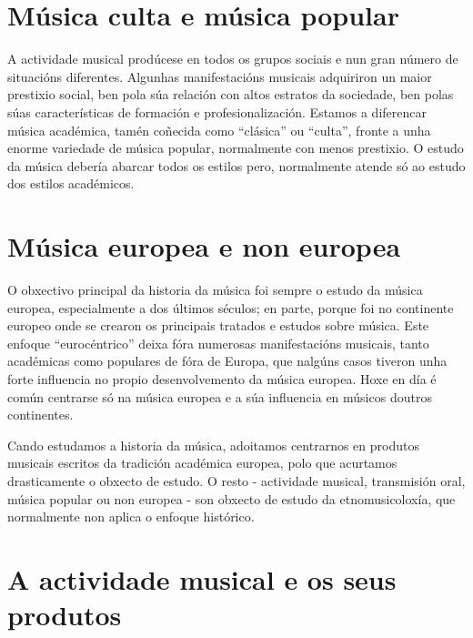 \documentclass[a4paper, twoside]{templates/ociamthesis}
\begin{document}
\hypertarget{muxfasica-culta-e-muxfasica-popular}{%
\section{Música culta e música popular}\label{muxfasica-culta-e-muxfasica-popular}}

A actividade musical prodúcese en todos os grupos sociais e nun gran número de situacións diferentes. Algunhas manifestacións musicais adquiriron un maior prestixio social, ben pola súa relación con altos estratos da sociedade, ben polas súas características de formación e profesionalización. Estamos a diferencar música académica, tamén coñecida como ``clásica'' ou ``culta'', fronte a unha enorme variedade de música popular, normalmente con menos prestixio. O estudo da música debería abarcar todos os estilos pero, normalmente atende só ao estudo dos estilos académicos.

\hypertarget{muxfasica-europea-e-non-europea}{%
\section{Música europea e non europea}\label{muxfasica-europea-e-non-europea}}

O obxectivo principal da historia da música foi sempre o estudo da música europea, especialmente a dos últimos séculos; en parte, porque foi no continente europeo onde se crearon os principais tratados e estudos sobre música. Este enfoque ``eurocéntrico'' deixa fóra numerosas manifestacións musicais, tanto académicas como populares de fóra de Europa, que nalgúns casos tiveron unha forte influencia no propio desenvolvemento da música europea. Hoxe en día é común centrarse só na música europea e a súa influencia en músicos doutros continentes.

Cando estudamos a historia da música, adoitamos centrarnos en produtos musicais escritos da tradición académica europea, polo que acurtamos drasticamente o obxecto de estudo. O resto - actividade musical, transmisión oral, música popular ou non europea - son obxecto de estudo da etnomusicoloxía, que normalmente non aplica o enfoque histórico.

\hypertarget{a-actividade-musical-e-os-seus-produtos}{%
\section{A actividade musical e os seus produtos}\label{a-actividade-musical-e-os-seus-produtos}}
\end{document}
